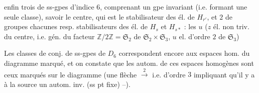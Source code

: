 
enfin trois   de ss-gpes  d'indice $6$,  comprenant un gpe invariant (i.e. formant une seule classe), savoir le centre, qui est le stabilisateur des él. de $H_{r'}$, et $2$   de groupes chacunes  resp. stabilisateurs des él. de $H_s$ et $H_{s*}$ : les \deleted{\unsure{$\varepsilon$}} $u$  ($z$ él. non triv. du centre, i.e. gén. du facteur $\mathbb Z/2\mathbb Z=\mathfrak S_2$ de $\mathfrak S_2\times\mathfrak S_3$, $u$ el. d'ordre $2$ de $\mathfrak S_3$)  

Les classes de conj. de ss-gpes de $D_6$ correspondent encore  aux  espaces hom. du diagramme marqué, et on constate que les autom. de ces espaces homogènes sont ceux marqués sur le diagramme (une flèche $\xrightarrow{2}$ i.e. d'ordre $3$ impliquant qu'il y a à la source un autom. inv. (ss pt fixe) --).

